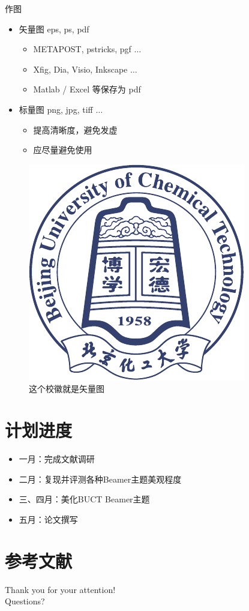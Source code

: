 \documentclass[no-math]{ctexbeamer}
\begin{document}
\begin{frame}{作图}
	\begin{itemize}
		\item 矢量图 eps, ps, pdf
		\begin{itemize}
			\item METAPOST, pstricks, pgf $\ldots$
			\item Xfig, Dia, Visio, Inkscape $\ldots$
			\item Matlab / Excel 等保存为 pdf
		\end{itemize}
		\item 标量图 png, jpg, tiff $\ldots$
		\begin{itemize}
			\item 提高清晰度，避免发虚
			\item 应尽量避免使用
		\end{itemize}
	\end{itemize}
	\begin{figure}[htpb]
		\centering
		\includegraphics[width=0.2\linewidth]{pic/BUCT-badge.pdf}
		\caption{这个校徽就是矢量图}
	\end{figure}
\end{frame}

\section{计划进度}
\begin{frame}
	\begin{itemize}
		\item 一月：完成文献调研
		\item 二月：复现并评测各种Beamer主题美观程度
		\item 三、四月：美化BUCT Beamer主题
		\item 五月：论文撰写
	\end{itemize}
\end{frame}

\section{参考文献}

\nocite{*}

\begin{frame}[allowframebreaks]
	\tiny
	
	
\end{frame}

\begin{frame}
	\begin{center}
		{\huge
			Thank you for your attention!\\
			Questions?
		}
	\end{center}
\end{frame}
\end{document}
